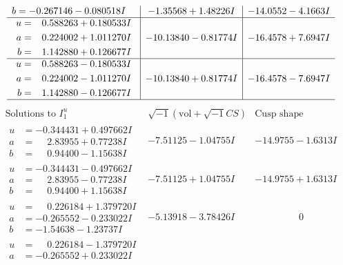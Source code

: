 \documentclass[1p]{elsarticle_modified}
\theoremstyle{definition}
\newcommand{\I}{\sqrt{-1}}
\begin{document}
$$\begin{array}{c|c|c}
\begin{aligned}
b &= -0.267146 - 0.080518 I\end{aligned}
 & -1.35568 + 1.48226 I & -14.0552 - 4.1663 I \\ \hline\begin{aligned}
u &= \phantom{-}0.588263 + 0.180533 I \\
a &= \phantom{-}0.224002 + 1.011270 I \\
b &= \phantom{-}1.142880 + 0.126677 I\end{aligned}
 & -10.13840 - 0.81774 I & -16.4578 + 7.6947 I \\ \hline\begin{aligned}
u &= \phantom{-}0.588263 - 0.180533 I \\
a &= \phantom{-}0.224002 - 1.011270 I \\
b &= \phantom{-}1.142880 - 0.126677 I\end{aligned}
 & -10.13840 + 0.81774 I & -16.4578 - 7.6947 I\\
 \hline 
 \end{array}$$\newpage$$\begin{array}{c|c|c}  
\text{Solutions to }I^u_{1}& \I (\text{vol} + \sqrt{-1}CS) & \text{Cusp shape}\\
 \hline 
\begin{aligned}
u &= -0.344431 + 0.497662 I \\
a &= \phantom{-}2.83955 + 0.77238 I \\
b &= \phantom{-}0.94400 - 1.15638 I\end{aligned}
 & -7.51125 - 1.04755 I & -14.9755 - 1.6313 I \\ \hline\begin{aligned}
u &= -0.344431 - 0.497662 I \\
a &= \phantom{-}2.83955 - 0.77238 I \\
b &= \phantom{-}0.94400 + 1.15638 I\end{aligned}
 & -7.51125 + 1.04755 I & -14.9755 + 1.6313 I \\ \hline\begin{aligned}
u &= \phantom{-}0.226184 + 1.379720 I \\
a &= -0.265552 - 0.233022 I \\
b &= -1.54638 - 1.23737 I\end{aligned}
 & -5.13918 - 3.78426 I & \phantom{-0.000000 } 0 \\ \hline\begin{aligned}
u &= \phantom{-}0.226184 - 1.379720 I \\
a &= -0.265552 + 0.233022 I \\

\end{aligned}
\end{array}$$
\end{document}
